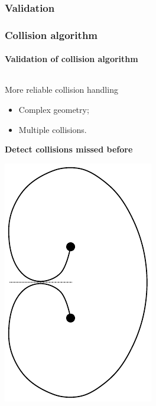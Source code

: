 \documentclass[aspectratio=1610,t,10pt]{beamer}
\begin{document}
\subsubsection{Validation}

\begin{frame}
\frametitle{Collision algorithm}
\framesubtitle{Validation of collision algorithm}
\vspace*{-1em}
\begin{columns}[t]
    \begin{column}{.48\textwidth}
        \begin{block}{More reliable collision handling}
            \begin{itemize}
                \item Complex geometry;
                \item Multiple collisions.
            \end{itemize}
            \centering
            \textbf{Detect collisions missed before}
        \end{block}
        \centering
        \begin{minipage}{0.30\linewidth}
            \includegraphics[width=\linewidth]{img/frankread}

\end{minipage}
\end{column}
\end{columns}
\end{frame}
\end{document}

